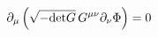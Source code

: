 \begin{equation}
\partial_\mu \left(\sqrt{- {\rm det} G} \,G^{\mu\nu} \partial_\nu
\Phi\right) = 0
\end{equation}


